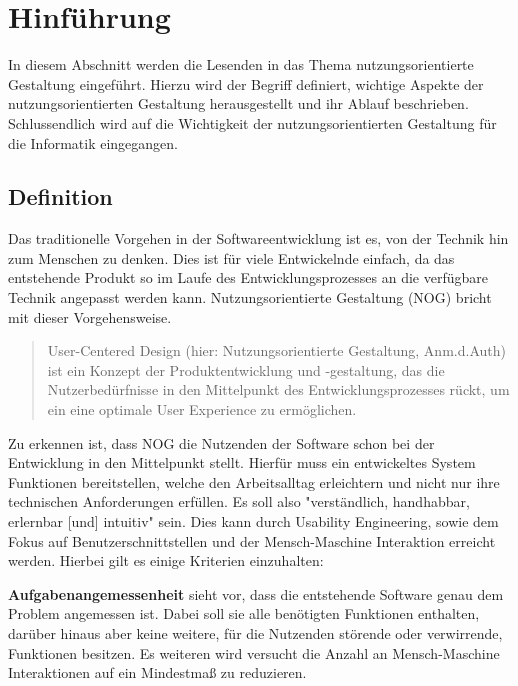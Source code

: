 \section{Hinführung}

In diesem Abschnitt werden die Lesenden in das Thema nutzungsorientierte Gestaltung eingeführt.
Hierzu wird der Begriff definiert, wichtige Aspekte der nutzungsorientierten Gestaltung herausgestellt und ihr Ablauf beschrieben.
Schlussendlich wird auf die Wichtigkeit der nutzungsorientierten Gestaltung für die Informatik eingegangen.

\subsection{Definition}\label{sec:definition}

Das traditionelle Vorgehen in der Softwareentwicklung ist es, von der Technik hin zum Menschen zu denken.
Dies ist für viele Entwickelnde einfach, da das entstehende Produkt so im Laufe des Entwicklungsprozesses an die verfügbare Technik angepasst werden kann.
Nutzungsorientierte Gestaltung (NOG) bricht mit dieser Vorgehensweise.

\begin{quote}
User-Centered Design (hier: Nutzungsorientierte Gestaltung, Anm.d.Auth) ist ein Konzept der Produktentwicklung und -gestaltung, das die Nutzerbedürfnisse in den Mittelpunkt des Entwicklungsprozesses rückt, um ein eine optimale User Experience zu ermöglichen. \cite{IONOS_nog_def}
\end{quote}

Zu erkennen ist, dass NOG die Nutzenden der Software schon bei der Entwicklung in den Mittelpunkt stellt.
Hierfür muss ein entwickeltes System Funktionen bereitstellen, welche den Arbeitsalltag erleichtern und nicht nur ihre technischen Anforderungen erfüllen.
Es soll also "verständlich, handhabbar, erlernbar [und] intuitiv" \cite{NOG} sein. 
Dies kann durch Usability Engineering, sowie dem Fokus auf Benutzerschnittstellen und der Mensch-Maschine Interaktion erreicht werden.
Hierbei gilt es einige Kriterien einzuhalten:

\textbf{Aufgabenangemessenheit} sieht vor, dass die entstehende Software genau dem Problem angemessen ist.
Dabei soll sie alle benötigten Funktionen enthalten, darüber hinaus aber keine weitere, für die Nutzenden störende oder verwirrende, Funktionen besitzen.
Es weiteren wird versucht die Anzahl an Mensch-Maschine Interaktionen auf ein Mindestmaß zu reduzieren.

